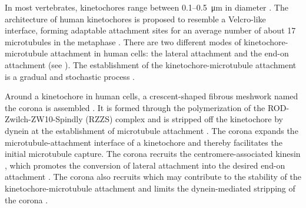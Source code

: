 In most vertebrates, kinetochores range between 0.1--\SI{0.5}{\micro m} in diameter \cite{Rieder+Salmon1998}. The architecture of human kinetochores is proposed to resemble a Velcro-like interface, forming adaptable attachment sites for an average number of about 17 microtubules in the metaphase \cite{Wendell1993, Zaytsev2014, Zaytsev2015, Velcro, Kukreja2020}. There are two different modes of kinetochore-microtubule attachment in human cells: the lateral attachment and the end-on attachment (see ). The establishment of the kinetochore-microtubule attachment is a gradual and stochastic process \cite{GradualStochastic}.

Around a kinetochore in human cells, a crescent-shaped fibrous meshwork named the corona is assembled \cite{CoronaReview_Kops+Gassman2020}. It is formed through the polymerization of the ROD-Zwilch-ZW10-Spindly (RZZS) complex \cite{RZZS_Sacristan2018} and is stripped off the kinetochore by dynein at the establishment of microtubule attachment \cite{DyneinStripsCorona}. The corona expands the microtubule-attachment interface of a kinetochore and thereby facilitates the initial microtubule capture. The corona recruits the centromere-associated kinesin , which promotes the conversion of lateral attachment into the desired end-on attachment \cite{Corona-CENP-E_Yao1997, GSK923295MonastrolCotreatment, CENPEActivity-BUBR1}. The corona also recruits  which may contribute to the stability of the kinetochore-microtubule attachment and limits the dynein-mediated stripping of the corona \cite{CENP-FLimitsStripping}.


